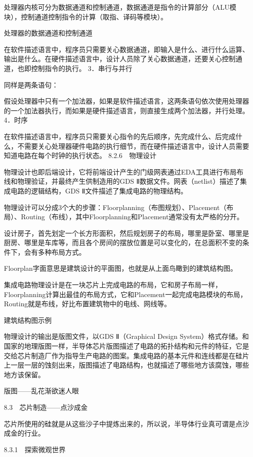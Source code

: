 \documentclass[12pt,UTF8]{ctexbook}
\begin{document}
处理器内核可分为数据通道和控制通道，数据通道是指令的计算部分（ALU模块），控制通道控制指令的计算（取指、译码等模块）。

处理器的数据通道和控制通道

在软件描述语言中，程序员只需要关心数据通道，即输入是什么、进行什么运算、输出是什么。在硬件描述语言中，设计人员除了关心数据通道，还要关心控制通道，也即控制指令的执行。
3．串行与并行

同样是两条语句：

假设处理器中只有一个加法器，如果是软件描述语言，这两条语句依次使用处理器的一个加法器执行，而如果是硬件描述语言，则直接生成两个加法器，并行处理。
4．时序

在软件描述语言中，程序员只需要关心指令的先后顺序，先完成什么、后完成什么，不需要关心处理器硬件电路的执行细节，而在硬件描述语言中，设计人员需要知道电路在每个时钟的执行状态。
8.2.6　物理设计

物理设计也即后端设计，它将前端设计产生的门级网表通过EDA工具进行布局布线和物理验证，并最终产生供制造用的GDS Ⅱ数据文件。网表（netlist）描述了集成电路的逻辑结构，GDS Ⅱ文件描述了集成电路的物理结构。

物理设计可以分成3个大的步骤：Floorplanning（布图规划）、Placement（布局）、Routing（布线），其中Floorplanning和Placement通常没有太严格的分开。

设计房子，首先划定一个长方形面积，然后规划房子的布局，哪里是卧室、哪里是厨房、哪里是车库等，而且各个房间的摆放位置是可以变化的，在总面积不变的条件下，会有多种布局方式。

Floorplan字面意思是建筑设计的平面图，也就是从上面鸟瞰到的建筑结构图。

集成电路物理设计是在一块芯片上完成电路的布局，它和房子布局一样，Floorplanning计算出最佳的布局方式，它和Placement一起完成电路模块的布局，Routing就是布线，好比布置建筑物中的电线、网线等。

建筑结构图示例

物理设计的输出是版图文件，以GDS Ⅱ（Graphical Design System）格式存储。和国家的地理版图一样，半导体芯片版图描述了电路的拓扑结构和元件的特征，它是交给芯片制造厂作为指导生产电路的图案。集成电路的基本元件和连线都是在硅片上一层一层的蚀刻出来，版图描述了电路结构，也就描述了哪些地方该腐蚀，哪些地方该保留。

版图——乱花渐欲迷人眼


8.3　芯片制造——点沙成金

芯片所使用的硅就是从这些沙子中提炼出来的，所以说，半导体行业真可谓是点沙成金的行业。

8.3.1　探索微观世界
\end{document}
